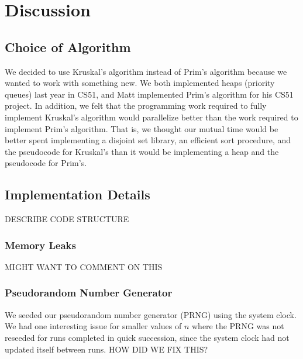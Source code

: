 \documentclass[solution, letterpaper]{cs121}
\begin{document}
\section*{Discussion}
\subsection*{Choice of Algorithm}
We decided to use Kruskal's algorithm instead of Prim's algorithm because we wanted to work with something new. We both implemented heaps (priority queues) last year in CS51, and Matt implemented Prim's algorithm for his CS51 project. In addition, we felt that the programming work required to fully implement Kruskal's algorithm would parallelize better than the work required to implement Prim's algorithm. That is, we thought our mutual time would be better spent implementing a disjoint set library, an efficient sort procedure, and the pseudocode for Kruskal's than it would be implementing a heap and the pseudocode for Prim's.

\subsection*{Implementation Details}
DESCRIBE CODE STRUCTURE

\subsubsection*{Memory Leaks}
MIGHT WANT TO COMMENT ON THIS

\subsubsection*{Pseudorandom Number Generator}
We seeded our pseudorandom number generator (PRNG) using the system clock. We had one interesting issue for smaller values of $n$ where the PRNG was not reseeded for runs completed in quick succession, since the system clock had not updated itself between runs. HOW DID WE FIX THIS?
\end{document}
